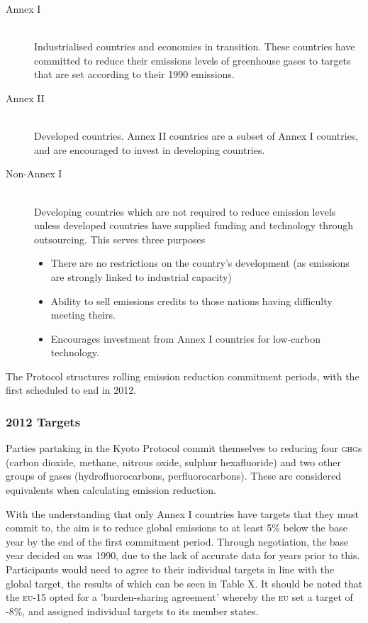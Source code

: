 \begin{description}
	\item[Annex I] \hfill \\
	Industrialised countries and economies in transition. These countries have committed to reduce their emissions levels of greenhouse gases to targets that are set according to their 1990 emissions.
	
	\item[Annex II] \hfill \\
	Developed countries. Annex II countries are a subset of Annex I countries, and are encouraged to invest in developing countries.

	\item[Non-Annex I] \hfill \\
	Developing countries which are not required to reduce emission levels unless developed countries have supplied funding and technology through outsourcing. This serves three purposes
	\begin{itemize}
		\item There are no restrictions on the country's development (as emissions are strongly linked to industrial capacity)
		\item Ability to sell emissions credits to those nations having difficulty meeting theirs.
		\item Encourages investment from Annex I countries for low-carbon technology.
	\end{itemize}
\end{description}

The Protocol structures rolling emission reduction commitment periods, with the first scheduled to end in 2012.

\subsubsection{2012 Targets}

Parties partaking in the Kyoto Protocol commit themselves to reducing four \textsc{ghg}s (carbon dioxide, methane, nitrous oxide, sulphur hexafluoride) and two other groups of gases (hydrofluorocarbons, perfluorocarbons). These are considered \CO equivalents when calculating emission reduction.

With the understanding that only Annex I countries have targets that they must commit to, the aim is to reduce global \CO emissions to at least 5\% below the base year by the end of the first commitment period. Through negotiation, the base year decided on was 1990, due to the lack of accurate data for years prior to this. Participants would need to agree to their individual targets in line with the global target, the results of which can be seen in Table X. It should be noted that the \textsc{eu}-15 opted for a 'burden-sharing agreement' whereby the \textsc{eu} set a target of -8\%, and assigned individual targets to its member states.

